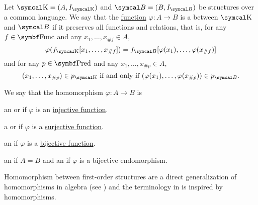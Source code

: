 \begin{definition}\label{def:first_order_homomorphism}
  Let \( \CK = (A, I_{\CK}) \) and \( \Cal{B} = (B, I_{\Cal{B}}) \) be structures over a common language. We say that the \hyperref[def:function]{function} \( \varphi: A \to B \) is a  between \( \CK \) and \( \Cal{B} \) if it preserves all functions and relations, that is, for any \( f \in \Bold{Func} \) and any \( x_1, \ldots, x_{\#f} \in A \),
  \begin{equation*}
    \varphi(f_{\CK}[x_1, \ldots, x_{\#f}]) = f_{\Cal{B}}[\varphi(x_1), \ldots, \varphi(x_{\#f})]
  \end{equation*}
  and for any \( p \in \Bold{Pred} \) and any \( x_1, \ldots, x_{\#p} \in A \),
  \begin{equation*}
    (x_1, \ldots, x_{\#p}) \in p_{\CK} \text{ if and only if } (\varphi(x_1), \ldots, \varphi(x_{\#p})) \in p_{\Cal{B}}.
  \end{equation*}

  We say that the homomorphism \( \varphi: A \to B \) is
  \begin{DefEnum}
     an  or  if \( \varphi \) is an \hyperref[def:function_invertibility/injection]{injective function}.

     a  or  if \( \varphi \) is a \hyperref[def:function_invertibility/surjection]{surjective function}.

     an  if \( \varphi \) is a \hyperref[def:function_invertibility/bijection]{bijective function}.

     an  if \( A = B \) and an  if \( \varphi \) is a bijective endomorphism.
  \end{DefEnum}

  Homomorphism between first-order structures are a direct generalization of homomorphisms in algebra (see ) and the terminology in  is inspired by homomorphisms.
\end{definition}

